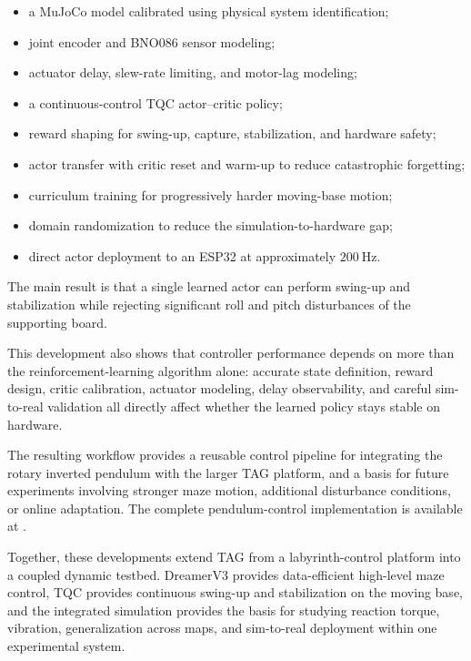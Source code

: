 \documentclass[9pt]{extarticle}
\begin{document}
\begin{itemize}
    \item a MuJoCo model calibrated using physical system identification;
    \item joint encoder and BNO086 sensor modeling;
    \item actuator delay, slew-rate limiting, and motor-lag modeling;
    \item a continuous-control TQC actor--critic policy;
    \item reward shaping for swing-up, capture, stabilization, and hardware
    safety;
    \item actor transfer with critic reset and warm-up to reduce
    catastrophic forgetting;
    \item curriculum training for progressively harder moving-base motion;
    \item domain randomization to reduce the simulation-to-hardware gap;
    \item direct actor deployment to an ESP32 at approximately
    $200~\mathrm{Hz}$.
\end{itemize}

The main result is that a single learned actor can perform swing-up and
stabilization while rejecting significant roll and pitch disturbances of
the supporting board.

This development also shows that controller performance depends on more
than the reinforcement-learning algorithm alone: accurate state
definition, reward design, critic calibration, actuator modeling, delay
observability, and careful sim-to-real validation all directly affect
whether the learned policy stays stable on hardware.

The resulting workflow provides a reusable control pipeline for integrating
the rotary inverted pendulum with the larger TAG platform, and a basis for
future experiments involving stronger maze motion, additional disturbance
conditions, or online adaptation. The complete pendulum-control implementation is available at
\cite{truong2026pendulum}.

Together, these developments extend TAG from a labyrinth-control platform into a coupled dynamic testbed. DreamerV3 provides data-efficient high-level maze control, TQC provides continuous swing-up and stabilization on the moving base, and the integrated simulation provides the basis for studying reaction torque, vibration, generalization across maps, and sim-to-real deployment within one experimental system.
\end{document}
